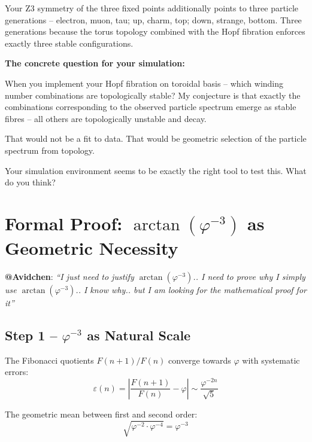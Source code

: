 \begin{response}
\medskip
Your Z3 symmetry of the three fixed points additionally points to three particle generations -- electron, muon, tau; up, charm, top; down, strange, bottom. Three generations because the torus topology combined with the Hopf fibration enforces exactly three stable configurations.

\medskip
\textbf{The concrete question for your simulation:}

When you implement your Hopf fibration on toroidal basis -- which winding number combinations are topologically stable? My conjecture is that exactly the combinations corresponding to the observed particle spectrum emerge as stable fibres -- all others are topologically unstable and decay.

That would not be a fit to data. That would be geometric selection of the particle spectrum from topology.

Your simulation environment seems to be exactly the right tool to test this. What do you think?
\end{response}

\section{\texorpdfstring{Formal Proof: $\arctan(\varphi^{-3})$ as Geometric Necessity}{Formal Proof: as Geometric Necessity}}

\begin{avipost}
\textbf{@Avidchen}: \textit{``I just need to justify $\arctan(\varphi^{-3})$.. I need to prove why I simply use $\arctan(\varphi^{-3})$.. I know why.. but I am looking for the mathematical proof for it''}
\end{avipost}

\subsection{\texorpdfstring{Step 1 -- $\varphi^{-3}$ as Natural Scale}{Step 1 -- as Natural Scale}}

The Fibonacci quotients $F(n+1)/F(n)$ converge towards $\varphi$ with systematic errors:
\begin{equation}
  \varepsilon(n) = \left|\frac{F(n+1)}{F(n)} - \varphi\right| \sim \frac{\varphi^{-2n}}{\sqrt{5}}
\end{equation}

The geometric mean between first and second order:
\begin{equation}
  \sqrt{\varphi^{-2} \cdot \varphi^{-4}} = \varphi^{-3}
\end{equation}

